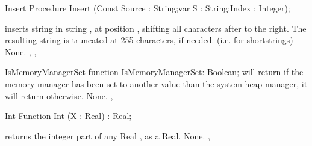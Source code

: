 
\begin{procedure}{Insert}
\Declaration
Procedure Insert (Const Source : String;var S : String;Index : Integer);

\Description
{} inserts string  in string , at position
, shifting all characters after  to the right. The
resulting string is truncated at 255 characters, if needed. (i.e. for
shortstrings)
\Errors
None.
\SeeAlso
{}, , 
\end{procedure}


\begin{function}{IsMemoryManagerSet}
\Declaration
function  IsMemoryManagerSet: Boolean;
\Description
{} will return  if the memory manager has
been set to another value than the system heap manager, it will return
 otherwise.
\Errors
None.
\SeeAlso
{}, 
\end{function}

\begin{function}{Int}
\Declaration
Function Int (X : Real) : Real;

\Description
{} returns the integer part of any Real , as a Real.
\Errors
None.
\SeeAlso
{}, 
\end{function}


